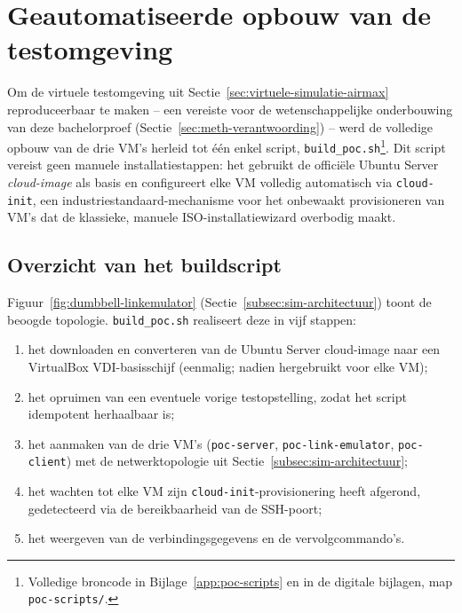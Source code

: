 
\section{Geautomatiseerde opbouw van de testomgeving}%
\label{sec:automatisering-poc}

Om de virtuele testomgeving uit Sectie~\ref{sec:virtuele-simulatie-airmax}
reproduceerbaar te maken -- een vereiste voor de wetenschappelijke onderbouwing van
deze bachelorproef (Sectie~\ref{sec:meth-verantwoording}) -- werd de volledige opbouw
van de drie VM's herleid tot één enkel script,
\texttt{build\_poc.sh}\footnote{Volledige broncode in Bijlage~\ref{app:poc-scripts} en in de
digitale bijlagen, map \texttt{poc-scripts/}.}. Dit script vereist geen manuele
installatiestappen: het gebruikt de officiële Ubuntu Server \textit{cloud-image} als
basis en configureert elke VM volledig automatisch via \texttt{cloud-init}, een
industriestandaard-mechanisme voor het onbewaakt provisioneren van VM's dat de
klassieke, manuele ISO-installatiewizard overbodig maakt.

\subsection{Overzicht van het buildscript}%
\label{subsec:automatisering-overzicht}

Figuur~\ref{fig:dumbbell-linkemulator} (Sectie~\ref{subsec:sim-architectuur}) toont de
beoogde topologie. \texttt{build\_poc.sh} realiseert deze in vijf stappen:

\begin{enumerate}
  \item het downloaden en converteren van de Ubuntu Server cloud-image naar een
        VirtualBox VDI-basisschijf (eenmalig; nadien hergebruikt voor elke VM);
  \item het opruimen van een eventuele vorige testopstelling, zodat het script
        idempotent herhaalbaar is;
  \item het aanmaken van de drie VM's (\texttt{poc-server}, \texttt{poc-link-emulator},
        \texttt{poc-client}) met de netwerktopologie uit
        Sectie~\ref{subsec:sim-architectuur};
  \item het wachten tot elke VM zijn \texttt{cloud-init}-provisionering heeft
        afgerond, gedetecteerd via de bereikbaarheid van de SSH-poort;
  \item het weergeven van de verbindingsgegevens en de vervolgcommando's.
\end{enumerate}

